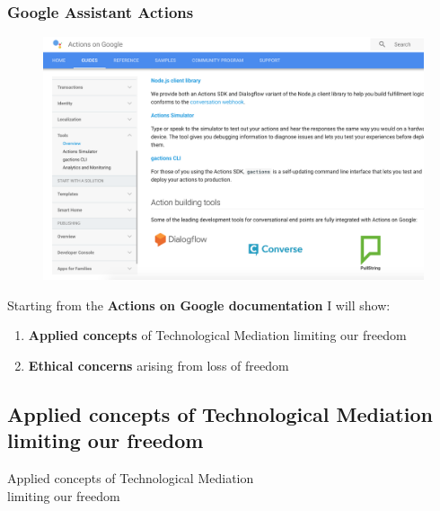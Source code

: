 \documentclass{beamer}
\begin{document}
\begin{frame}
\frametitle{Google Assistant Actions}
\vspace{-0.5cm}
\begin{figure}
	\centering
	\includegraphics[width=0.85\linewidth]{images/documentation_preview}
	\label{fig:documentationpreview}
\end{figure}

{\small Starting from the \textbf{Actions on Google documentation} I will show:
\begin{enumerate}
	\item \textbf{Applied concepts} of Technological Mediation limiting our freedom
	\item \textbf{Ethical concerns} arising from loss of freedom
\end{enumerate}
}

\end{frame}

\subsection{Applied concepts of Technological Mediation limiting our freedom}
\begin{frame}
\begin{center} 
	 Applied concepts of Technological Mediation\\limiting our freedom
\end{center}
\end{frame}
\end{document}
